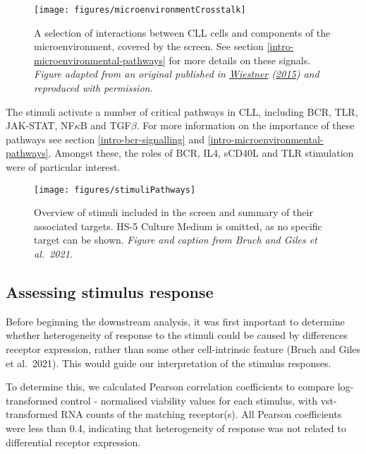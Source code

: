 \documentclass[11pt, a4paper, twosided]{book}
\begin{document}
\begin{figure}

{\centering \texttt{[image: figures/microenvironmentCrosstalk]} 

}

\caption{A selection of interactions between CLL cells and components of the microenvironment, covered by the screen. See section \ref{intro-microenvironmental-pathways} for more details on these signals. \emph{Figure adapted from an original published in \protect\hyperlink{ref-Wiestner2015}{Wiestner} (\protect\hyperlink{ref-Wiestner2015}{2015}) and reproduced with permission.}}\label{fig:microenvironmentCrosstalk}
\end{figure}
The stimuli activate a number of critical pathways in CLL, including BCR, TLR, JAK-STAT, NF\(\kappa\)B and TGF\(\beta\). For more information on the importance of these pathways see section \ref{intro-bcr-signalling} and \ref{intro-microenvironmental-pathways}. Amongst these, the roles of BCR, IL4, sCD40L and TLR stimulation were of particular interest.


\begin{figure}

{\centering \texttt{[image: figures/stimuliPathways]} 

}

\caption{Overview of stimuli included in the screen and summary of their associated targets. HS-5 Culture Medium is omitted, as no specific target can be shown. \emph{Figure and caption from Bruch and Giles et al.~2021.}}\label{fig:stimuliPathways}
\end{figure}
\hypertarget{rna-correlations}{%
\subsection{Assessing stimulus response}\label{rna-correlations}}

Before beginning the downstream analysis, it was first important to determine whether heterogeneity of response to the stimuli could be caused by differences receptor expression, rather than some other cell-intrinsic feature (Bruch and Giles et al.~2021). This would guide our interpretation of the stimulus responses.

To determine this, we calculated Pearson correlation coefficients to compare log-transformed control - normalised viability values for each stimulus, with vst-transformed RNA counts of the matching receptor(s). All Pearson coefficients were less than 0.4, indicating that heterogeneity of response was not related to differential receptor expression.
\end{document}
